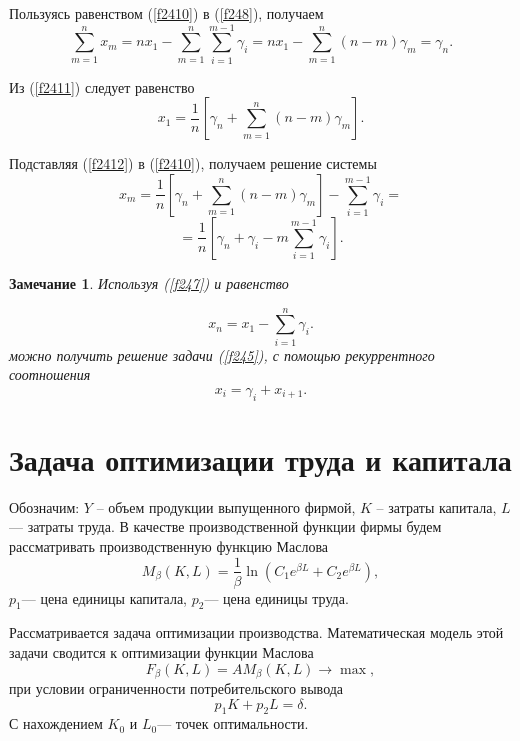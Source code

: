 \documentclass[12pt,openbib]{report}
\newtheorem{zam}{\hspace{5mm} Замечание}[chapter]
\begin{document}
Пользуясь равенством (\ref{f2410}) в (\ref{f248}), получаем
\begin{equation}\label{f2411}
\sum_{m=1}^nx_m=nx_1-\sum_{m=1}^n\sum_{i=1}^{m-1}\gamma_i=nx_1-\sum_{m=1}^n(n-m)\gamma_m=\gamma_n.
\end{equation}

Из (\ref{f2411}) следует равенство
\begin{equation}\label{f2412}
x_1=\frac1n\left[\gamma_n+\sum_{m=1}^n(n-m)\gamma_m\right].
\end{equation}

Подставляя (\ref{f2412}) в (\ref{f2410}), получаем решение системы
$$x_m=\frac1n\left[\gamma_n+\sum_{m=1}^n(n-m)\gamma_m\right]-\sum_{i=1}^{m-1}\gamma_i=$$
\begin{equation}\label{f2413}
=\frac1n\left[\gamma_n+\gamma_i-m\sum_{i=1}^{m-1}\gamma_i\right].
\end{equation}

\begin{zam} Используя (\ref{f247}) и равенство

\begin{equation}\label{f2414}
x_n=x_1-\sum_{i=1}^{n}\gamma_i.
\end{equation}
можно получить решение задачи (\ref{f245}), с помощью рекуррентного соотношения
\begin{equation}\label{f2415}
x_i=\gamma_i+x_{i+1}.
\end{equation}
\end{zam}

\section{Задача оптимизации труда и капитала}

Обозначим: $Y$ -- объем продукции выпущенного фирмой, $K$ -- затраты капитала, $L$ --- затраты труда.
В качестве производственной функции фирмы будем рассматривать производственную функцию Маслова
\begin{equation}\label{f251}
M_\beta(K,L)=\frac1\beta\ln\left(C_1e^{\beta L}+C_2e^{\beta L}\right),
\end{equation}
$p_1$--- цена единицы капитала, $p_2$--- цена единицы труда.

Рассматривается задача оптимизации производства. Математическая модель этой задачи сводится к оптимизации функции Маслова
\begin{equation}\label{f252}
F_\beta(K,L)=AM_\beta(K,L)\to\max,
\end{equation}
при условии ограниченности потребительского вывода
\begin{equation}\label{f253}
p_1K+p_2L=\delta.
\end{equation}
С нахождением $K_0$ и $L_0$--- точек оптимальности.
\end{document}
